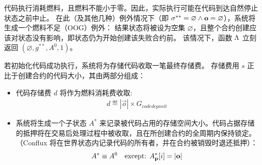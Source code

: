 代码执行消耗燃料，且燃料不能小于零。因此，实际执行可能在代码到达自然停止状态之前中止。
在此（及其他几种）例外情况下（即 $\mathbf{\sigma}^{**}=\varnothing \land \mathbf{o}=\varnothing$），系统将生成一个燃料不足（OOG）例外：
结果状态将被设为空集 $\varnothing$，且整个合约创建应该对状态没有影响，即状态仍为开始创建该失败合约前。
%
该情况下，函数 $\mathrm{\Lambda}$ 立刻返回 $(\varnothing,g^{**},A^0,1)$。


若初始化代码成功执行，系统将为存储代码收取一笔最终存储费。
存储费用 $s$ 正比于创建合约的代码大小，其由两部分组成：
\begin{itemize}
	\item 代码存储费 $d$ 将作为燃料消耗费收取:
	\begin{align}
		d \eqdef   |\vec{o}| \times G_{codedeposit}
	\end{align}

	\item 系统将生成一个子状态 $A^{*}$ 来记录被代码占用的存储空间大小。代码占据存储的抵押将在交易后处理过程中被收取，且在所创建合约的全周期内保持锁定。（Conflux 将在世界状态内记录代码的所有者，并在合约被销毁时退还抵押）：
	\begin{align}
		A^{*} \equiv   A^0 \quad\mbox{except: }A^*_{\bf p}[i]=|\mathbf{o}|
	\end{align}
\end{itemize}

